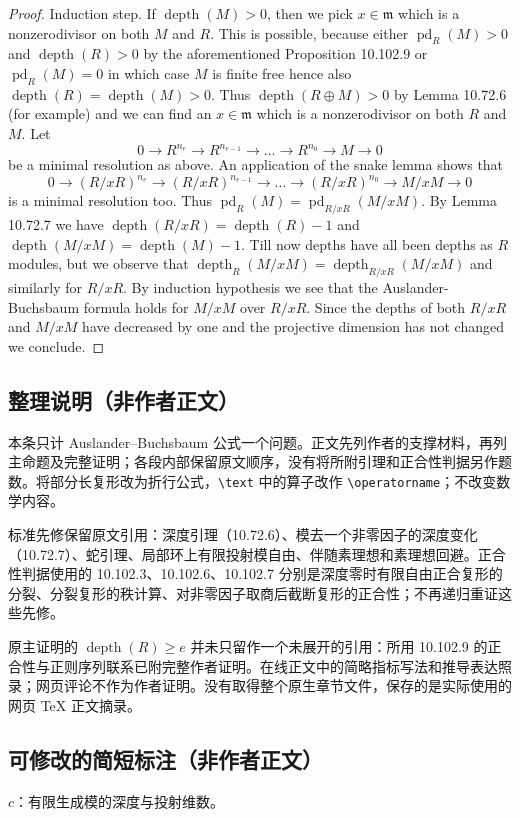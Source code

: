 \documentclass[UTF8,11pt]{ctexart}
\begin{document}
\begin{proof}
Induction step. If $\operatorname{depth}(M)>0$, then we pick $x\in\mathfrak m$ which is a nonzerodivisor on both $M$ and $R$. This is possible, because either $\operatorname{pd}_R(M)>0$ and $\operatorname{depth}(R)>0$ by the aforementioned Proposition 10.102.9 or $\operatorname{pd}_R(M)=0$ in which case $M$ is finite free hence also $\operatorname{depth}(R)=\operatorname{depth}(M)>0$. Thus $\operatorname{depth}(R\oplus M)>0$ by Lemma 10.72.6 (for example) and we can find an $x\in\mathfrak m$ which is a nonzerodivisor on both $R$ and $M$. Let
\[
0\to R^{n_e}\to R^{n_{e-1}}\to\ldots\to R^{n_0}\to M\to0
\]
be a minimal resolution as above. An application of the snake lemma shows that
\[
0\to(R/xR)^{n_e}\to(R/xR)^{n_{e-1}}\to\ldots\to(R/xR)^{n_0}\to M/xM\to0
\]
is a minimal resolution too. Thus $\operatorname{pd}_R(M)=\operatorname{pd}_{R/xR}(M/xM)$. By Lemma 10.72.7 we have $\operatorname{depth}(R/xR)=\operatorname{depth}(R)-1$ and $\operatorname{depth}(M/xM)=\operatorname{depth}(M)-1$. Till now depths have all been depths as $R$ modules, but we observe that $\operatorname{depth}_R(M/xM)=\operatorname{depth}_{R/xR}(M/xM)$ and similarly for $R/xR$. By induction hypothesis we see that the Auslander-Buchsbaum formula holds for $M/xM$ over $R/xR$. Since the depths of both $R/xR$ and $M/xM$ have decreased by one and the projective dimension has not changed we conclude.
\end{proof}


\subsection*{整理说明（非作者正文）}
本条只计 Auslander--Buchsbaum 公式一个问题。正文先列作者的支撑材料，再列主命题及完整证明；各段内部保留原文顺序，没有将所附引理和正合性判据另作题数。将部分长复形改为折行公式，\verb|\text| 中的算子改作 \verb|\operatorname|；不改变数学内容。

标准先修保留原文引用：深度引理（10.72.6）、模去一个非零因子的深度变化（10.72.7）、蛇引理、局部环上有限投射模自由、伴随素理想和素理想回避。正合性判据使用的 10.102.3、10.102.6、10.102.7 分别是深度零时有限自由正合复形的分裂、分裂复形的秩计算、对非零因子取商后截断复形的正合性；不再递归重证这些先修。

原主证明的 $\operatorname{depth}(R)\geq e$ 并未只留作一个未展开的引用：所用 10.102.9 的正合性与正则序列联系已附完整作者证明。在线正文中的简略指标写法和推导表达照录；网页评论不作为作者证明。没有取得整个原生章节文件，保存的是实际使用的网页 TeX 正文摘录。

\subsection*{可修改的简短标注（非作者正文）}
$c$：有限生成模的深度与投射维数。
\end{document}
